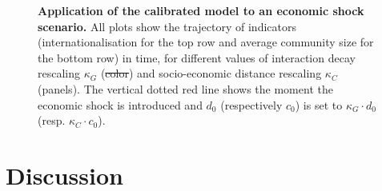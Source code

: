 \documentclass[10pt,letterpaper]{article}
\providecommand{\DIFadd}[1]{{\protect\color{blue}\uwave{#1}}} %
\providecommand{\DIFdel}[1]{{\protect\color{red}\sout{#1}}}                      %
\providecommand{\DIFdelbegin}{} %
\providecommand{\DIFdelend}{} %
\providecommand{\DIFaddFL}[1]{\DIFadd{#1}} %
\providecommand{\DIFdelFL}[1]{\DIFdel{#1}} %
\providecommand{\DIFaddbeginFL}{} %
\providecommand{\DIFaddendFL}{} %
\providecommand{\DIFdelbeginFL}{} %
\providecommand{\DIFdelendFL}{} %
\begin{document}
\DIFdelbegin %

\DIFdelend %
\begin{figure}
    \DIFaddbeginFL \begin{center}
    \DIFaddendFL %
    \DIFdelbeginFL %
\DIFdelendFL \DIFaddbeginFL \end{center}
	\DIFaddendFL \caption{\textbf{Application of the calibrated model to an economic shock scenario.} All plots show the trajectory of indicators (internationalisation for the top row and average community size for the bottom row) in time, for different values of interaction decay rescaling $\kappa_G$ (\DIFdelbeginFL \DIFdelFL{color}\DIFdelendFL \DIFaddbeginFL \DIFaddFL{colour}\DIFaddendFL ) and socio-economic distance rescaling $\kappa_C$ (panels). The vertical dotted red line shows the moment the economic shock is introduced and $d_0$ (respectively $c_0$) is set to $\kappa_G \cdot d_0$ (resp. $\kappa_C \cdot c_0$).\label{fig:fig9}}
\end{figure}



\section*{Discussion}
\end{document}
